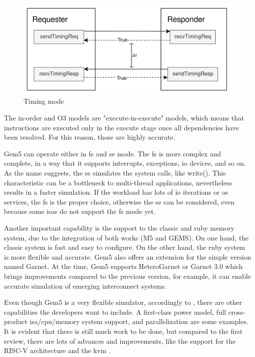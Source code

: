 \begin{figure}[H]
	\centering
 	\includegraphics[width=0.7\linewidth]{Images/TimingMode.png}
 	\caption{Timing mode}
	 \label{fig_TimingMode}
\end{figure}

The in-order and O3 models are "execute-in-execute" models, which means that instructions are executed only in the execute stage once all dependencies have been resolved. For this reason, those are highly accurate.

Gem5 can operate either in \gls{fs} and \gls{se} mode. The \gls{fs} is more complex and complete, in a way that it supports interrupts, exceptions, \gls{io} devices, and so on. As the name suggests, the \gls{se} simulates the system calls, like write(). This characteristic can be a bottleneck to multi-thread applications, nevertheless results in a faster simulation. If the workload has lots of \gls{io} iterations or \gls{os} services, the \gls{fs} is the proper choice, otherwise the \gls{se} can be considered, even because some \glspl{isa} do not support the \gls{fs} mode yet. 

Another important capability is the support to the classic and ruby memory system, due to the integration of both works (M5 and GEMS). On one hand, the classic system is fast and easy to configure. On the other hand, the ruby system is more flexible and accurate. Gem5 also offers an extension for the simple version named Garnet. At the time, Gem5 supports HeteroGarnet or Garnet 3.0 which brings improvements compared to the previous version, for example, it can enable accurate simulation of emerging interconnect systems. 


Even though Gem5 is a very flexible simulator, accordingly to \cite{TheGem5Simulator}, there are other capabilities the developers want to include. A first-class power model, full cross-product \gls{isa}/\gls{cpu}/memory system support, and parallelization are some examples.  It is evident that there is still much work to be done, but compared to the first review, there are lots of advances and improvements, like the support for the RISC-V architecture and the \gls{kvm} \cite{Thegem5simulatorV2}. 



